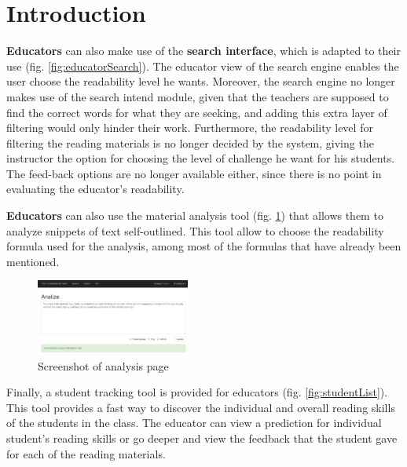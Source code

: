 \documentclass{sig-alternate-05-2015}
\begin{document}
\section{Introduction}


\textbf{Educators} can also make use of the \textbf{search interface}, which is adapted to their use (fig. \ref{fig:educatorSearch}). The educator view of the search engine enables the user choose the readability level he wants. Moreover, the search engine no longer makes use of the search intend module, given that the teachers are supposed to find the correct words for what they are seeking, and adding this extra layer of filtering would only hinder their work. Furthermore, the readability level for filtering the reading materials is no longer decided by the system, giving the instructor the option for choosing the level of challenge he want for his students. The feed-back options are no longer available either, since there is no point in evaluating the educator's readability.


\textbf{Educators} can also use the material analysis tool (fig. \ref{fig:analysispage}) that allows them to analyze snippets of text self-outlined. This tool allow to choose the readability formula used for the analysis, among most of the formulas that have already been mentioned.

\begin{figure}[h!]
 \centering
  \includegraphics[width=0.45\textwidth]{creatingFigures/Capture22}
 \caption{Screenshot of analysis page}
 \label{fig:analysispage}
 \end{figure}
 
 
 
Finally, a student tracking tool is provided for educators (fig. \ref{fig:studentList}). This tool provides a fast way to discover the individual and overall reading skills of the students in the  class. The educator can view a prediction for individual student's reading skills or go deeper and view the feedback that the student gave for each of the reading materials.




%
\end{document}
